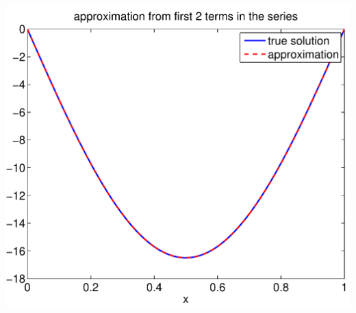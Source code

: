 {\begin{solution}
\begin{enumerate}
\begin{center}
   \includegraphics[scale=0.4]{bvps4_2}


\end{center}
\end{enumerate}
\end{solution}}
